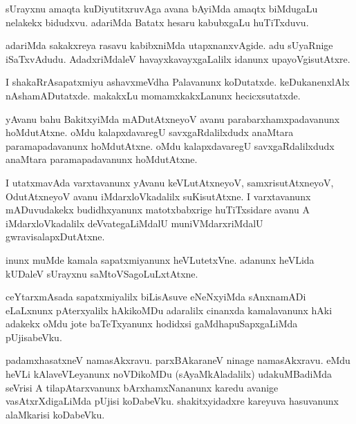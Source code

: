 \documentclass{article}
\begin{document}
\begin{mn}
sUrayxnu  amaqta  kuDiyutitxruvAga  avana  bAyiMda  amaqtx  biMdugaLu  nelakekx  bidudxvu.  
adariMda   Batatx  hesaru  kabubxgaLu  huTiTxduvu.
\end{mn}

\begin{mn}
adariMda  sakakxreya  rasavu  kabibxniMda  utapxnanxvAgide.  adu  sUyaRnige  
iSaTxvAdudu.  AdadxriMdaleV  havayxkavayxgaLalilx  idanunx  upayoVgisutAtxre.  
\end{mn}

\begin{mn}
I  shakaRrAsapatxmiyu  ashavxmeVdha  Palavanunx  koDutatxde.  keDukanenxlAlx  
nAshamADutatxde.  makakxLu  momamxkakxLanunx  hecicxsutatxde.
\end{mn}

\begin{mn}
yAvanu  bahu  BakitxyiMda  mADutAtxneyoV  avanu  parabarxhamxpadavanunx  hoMdutAtxne.  
oMdu  kalapxdavaregU  savxgaRdalilxdudx  anaMtara  paramapadavanunx  hoMdutAtxne.  
oMdu  kalapxdavaregU  savxgaRdalilxdudx  anaMtara  paramapadavanunx  hoMdutAtxne.
\end{mn}

\begin{mn}
I  utatxmavAda  varxtavanunx  yAvanu  keVLutAtxneyoV,  samxrisutAtxneyoV,  OdutAtxneyoV  avanu  
iMdarxloVkadalilx  suKisutAtxne.  I  varxtavanunx  mADuvudakekx  budidhxyanunx  matotxbabxrige  
huTiTxsidare  avanu  A  iMdarxloVkadalilx  deVvategaLiMdalU  muniVMdarxriMdalU  gwravisalapxDutAtxne.
\end{mn}

\begin{mn}
inunx  muMde  kamala sapatxmiyanunx  heVLutetxVne.  adanunx  heVLida  kUDaleV  sUrayxnu  saMtoVSagoLuLxtAtxne. 
\end{mn}

\begin{mn}
ceYtarxmAsada  sapatxmiyalilx  biLisAsuve  eNeNxyiMda  sAnxnamADi  eLaLxnunx  
pAterxyalilx  hAkikoMDu  adaralilx  cinanxda  kamalavanunx  hAki  adakekx  
oMdu  jote  baTeTxyanunx  hodidxsi  gaMdhapuSapxgaLiMda  pUjisabeVku.
\end{mn}

\begin{mn}
padamxhasatxneV  namasAkxravu.  parxBAkaraneV  ninage  namasAkxravu.  eMdu  heVLi  
kAlaveVLeyanunx  noVDikoMDu (sAyaMkAladalilx) udakuMBadiMda  seVrisi  A  
tilapAtarxvanunx  bArxhamxNananunx  karedu  avanige  vasAtxrXdigaLiMda  pUjisi  
koDabeVku.  shakitxyidadxre  kareyuva  hasuvanunx  alaMkarisi  koDabeVku.
\end{mn}
\end{document}
